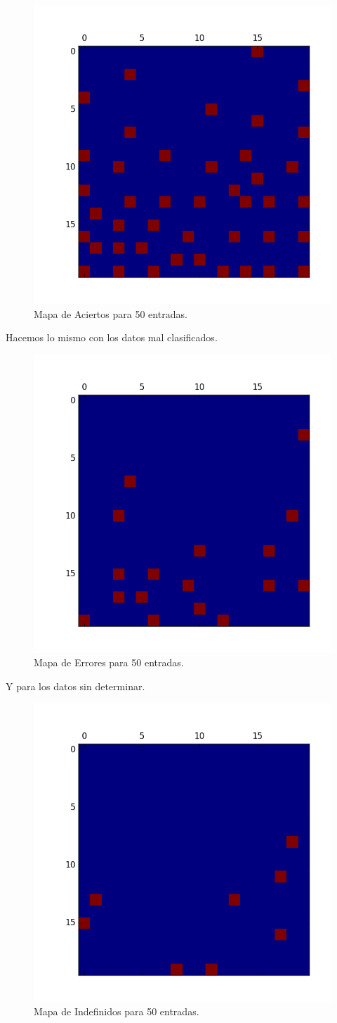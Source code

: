 \begin{figure}[H]
  \centering
  \includegraphics[width=0.5\columnwidth]{secciones/graficos/kohonen/mapaaciertos50.png}
  \caption{Mapa de Aciertos para 50 entradas.}
  \label{fig:mapa aciertos 50}
\end{figure}

Hacemos lo mismo con los datos mal clasificados.

\begin{figure}[H]
  \centering
  \includegraphics[width=0.5\columnwidth]{secciones/graficos/kohonen/mapaerrores50.png}
  \caption{Mapa de Errores para 50 entradas.}
  \label{fig:mapa errores 50}
\end{figure}


Y para los datos sin determinar.

\begin{figure}[H]
  \centering
  \includegraphics[width=0.5\columnwidth]{secciones/graficos/kohonen/mapaindefinidas50.png}
  \caption{Mapa de Indefinidos para 50 entradas.}
  \label{fig:mapa indefinidos 50}
\end{figure}


